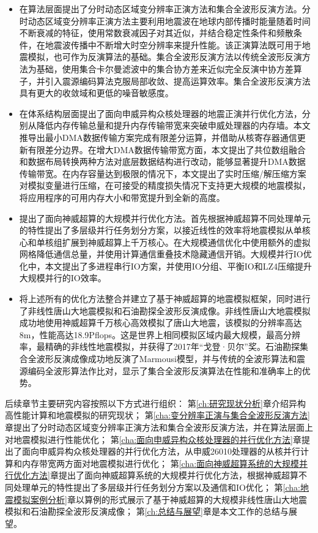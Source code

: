 \begin{itemize}
  \item 在算法层面提出了分时动态区域变分辨率正演方法和集合全波形反演方法。分时动态区域变分辨率正演方法主要利用地震波在地球内部传播时能量随着时间不断衰减的特征，使用常数衰减因子对其近似，并结合稳定性条件和频散条件，在地震波传播中不断增大时空分辨率来提升性能。该正演算法既可用于地震模拟，也可作为反演算法的基础。集合全波形反演方法以传统全波形反演方法为基础，使用集合卡尔曼滤波中的集合协方差来近似完全反演中协方差算子，并引入震源编码算法克服局部收敛、提高运算效率。集合全波形反演方法具有更大的收敛域和更低的噪音敏感度。

  \item 在体系结构层面提出了面向申威异构众核处理器的地震正演并行优化方法，分别从降低内存传输总量和提升内存传输带宽来突破申威处理器的内存墙。本文推导出最小DMA数据传输方案完成有限差分运算，并借助从核寄存器通信更新有限差分边界。在增大DMA数据传输带宽方面，本文提出了共位数组融合和数据布局转换两种方法对底层数据结构进行改动，能够显著提升DMA数据传输带宽。在内存容量达到极限的情况下，本文提出了实时压缩/解压缩方案对模拟变量进行压缩，在可接受的精度损失情况下支持更大规模的地震模拟，将应用程序的可用内存大小和带宽提升到全新的高度。

  \item 提出了面向神威超算的大规模并行优化方法。首先根据神威超算不同处理单元的特性提出了多层级并行任务划分方案，以接近线性的效率将地震模拟从单核心和单核组扩展到神威超算上千万核心。在大规模通信优化中使用额外的虚拟网格降低通信总量，并使用计算通信重叠技术隐藏通信开销。大规模并行IO优化中，本文提出了多进程串行IO方案，并使用IO分组、平衡IO和LZ4压缩提升大规模并行的IO效率。

  \item 将上述所有的优化方法整合并建立了基于神威超算的地震模拟框架，同时进行了非线性唐山大地震模拟和石油勘探全波形反演成像。非线性唐山大地震模拟成功地使用神威超算千万核心高效模拟了唐山大地震，该模拟的分辨率高达8m，性能高达18.9Pflops。这是世界上相同模拟区域内最大规模，最高分辨率，最精确的非线性地震模拟，并获得了2017年“戈登·贝尔”奖。石油勘探集合全波形反演成像成功地反演了Marmousi模型，并与传统的全波形算法和震源编码全波形算法作比对，显示了集合全波形反演算法在性能和准确率上的优势。

\end{itemize}

后续章节主要研究内容按照以下方式进行组织：
第\ref{ch:研究现状分析}章介绍异构高性能计算和地震模拟的研究现状；
第\ref{cha:变分辨率正演与集合全波形反演方法}章提出了分时动态区域变分辨率正演方法和集合全波形反演方法，并在算法层面上对地震模拟进行性能优化；
第\ref{cha:面向申威异构众核处理器的并行优化方法}章提出了面向申威异构众核处理器的并行优化方法，从申威26010处理器的从核并行计算和内存带宽两方面对地震模拟进行优化；
第\ref{cha:面向神威超算系统的大规模并行优化方法}章提出了面向神威超算系统的大规模并行优化方法，根据神威超算不同处理单元的特性提出了多层级并行任务划分方案以及通信和IO优化；
第\ref{cha:地震模拟案例分析}章以算例的形式展示了基于神威超算的大规模非线性唐山大地震模拟和石油勘探全波形反演成像；
第\ref{ch:总结与展望}章是本文工作的总结与展望。



